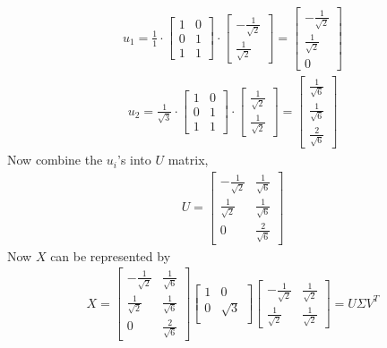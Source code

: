 \documentclass[12pt]{report}
\begin{document}
\begin{eqnarray*}
    u_1 =
    \frac{1}{1}\cdot\begin{bmatrix}
        1 & 0 \\ 
        0 & 1 \\
        1 & 1
    \end{bmatrix}\cdot\begin{bmatrix}
        -\frac{1}{\sqrt{2}} \\ 
        \frac{1}{\sqrt{2}}
    \end{bmatrix} = \begin{bmatrix}
        -\frac{1}{\sqrt{2}} \\ 
        \frac{1}{\sqrt{2}} \\
        0
    \end{bmatrix}
    \end{eqnarray*}
    \begin{eqnarray*}
    u_2 =
    \frac{1}{\sqrt{3}}\cdot\begin{bmatrix}
        1 & 0 \\ 
        0 & 1 \\
        1 & 1
    \end{bmatrix}\cdot\begin{bmatrix}
        \frac{1}{\sqrt{2}} \\ 
        \frac{1}{\sqrt{2}}
    \end{bmatrix} = \begin{bmatrix}
        \frac{1}{\sqrt{6}} \\ 
        \frac{1}{\sqrt{6}} \\
        \frac{2}{\sqrt{6}}
    \end{bmatrix}
    \end{eqnarray*}
Now combine the $u_i$'s into $U$ matrix,
    \begin{eqnarray*}
    U = \begin{bmatrix}
        -\frac{1}{\sqrt{2}} & \frac{1}{\sqrt{6}} \\ 
        \frac{1}{\sqrt{2}} & \frac{1}{\sqrt{6}} \\
        0 & \frac{2}{\sqrt{6}}
    \end{bmatrix}
    \end{eqnarray*}
Now $X$ can be represented by
    \begin{eqnarray*}
        X = 
        \begin{bmatrix}
            -\frac{1}{\sqrt{2}} & \frac{1}{\sqrt{6}} \\ 
            \frac{1}{\sqrt{2}} & \frac{1}{\sqrt{6}} \\
            0 & \frac{2}{\sqrt{6}}
        \end{bmatrix}
        \begin{bmatrix}
            1 & 0\\ 
            0 & \sqrt{3}\\
        \end{bmatrix}
        \begin{bmatrix}
            -\frac{1}{\sqrt{2}} & \frac{1}{\sqrt{2}} \\ 
            \frac{1}{\sqrt{2}} & \frac{1}{\sqrt{2}}
        \end{bmatrix}
        = U\Sigma V^T
    \end{eqnarray*}
\end{document}
